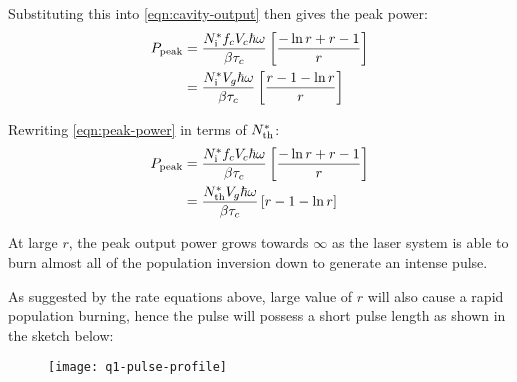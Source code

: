 \begin{parts}
	Substituting this into \eqref{eqn:cavity-output} then gives the peak power:
	\begin{align}
		P_\textnormal{peak} &= \frac{N^*_\textnormal{i} f_c V_c \hbar\omega}{\beta\tau_c} \left[ \frac{-\ln r + r - 1}{r} \right] \notag \\
		&= \frac{N^*_\textnormal{i} V_g \hbar\omega}{\beta\tau_c} \left[ \frac{r-1-\ln r}{r} \right] \label{eqn:peak-power}
	\end{align}
	
	Rewriting \eqref{eqn:peak-power} in terms of $N^*_\textnormal{th}$:
	\begin{align*}
		P_\textnormal{peak} &= \frac{N^*_\textnormal{i} f_c V_c \hbar\omega}{\beta\tau_c} \left[ \frac{-\ln r + r - 1}{r} \right] \notag \\
		&= \frac{N^*_\textnormal{th} V_g \hbar\omega}{\beta\tau_c} \left[ r-1-\ln r \right]
	\end{align*}
	
	At large $r$, the peak output power grows towards $\infty$ as the laser system is able to burn almost all of the population inversion down to generate an intense pulse.
	
	As suggested by the rate equations above, large value of $r$ will also cause a rapid population burning, hence the pulse will possess a short pulse length as shown in the sketch below:
	\begin{figure}[H]
		\centering
		\texttt{[image: q1-pulse-profile]}
	\end{figure}
\end{parts}